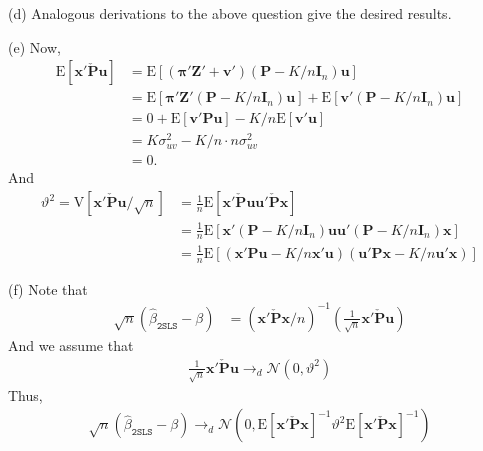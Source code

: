 \documentclass[11pt]{article}
\newcommand{\E}{\mathrm{E}}
\newcommand{\V}{\mathrm{V}}
\newcommand{\N}{\mathcal{N}}
\begin{document}
\iffalse
Now, to show the convergence result note that
\begin{align*}
\check{\bm{v}}'(\bm{P} -K/n\bm{I}_n) \bm{u} &= {\bm{v}}'\bm{P}\bm{u} -  \frac{\sigma^2_{uv}}{\sigma^2_u}\bm{u}'\bm{P}\bm{u} - \frac{K}{n}\bm{v}'\bm{u} + \frac{K}{n}\frac{\sigma^2_{uv}}{\sigma^2_u}\bm{u}'\bm{u}
\end{align*}
Thus
\begin{align*}
\frac{1}{\sqrt{K}} \check{\bm{v}}'(\bm{P} -K/n\bm{I}_n) \bm{u} =  {\bm{v}}'\bm{P}\bm{u} -  \frac{\sigma^2_{uv}}{\sigma^2_u}\bm{u}'\bm{P}\bm{u} - \frac{K}{n}\bm{v}'\bm{u} + \frac{K}{n}\frac{\sigma^2_{uv}}{\sigma^2_u}\bm{u}'\bm{u}
\end{align*}
\fi

(d)
Analogous derivations to the above question give the desired results.

(e)
Now,
\begin{align*}
\E[\bm{x}'\check{\bm{P}}\bm{u}] &= \E[(\bm{\pi}'\bm{Z}'+\bm{v}')(\bm{P} -K/n\bm{I}_n)\bm{u}]\\
&= \E[\bm{\pi}'\bm{Z}'(\bm{P} -K/n\bm{I}_n)\bm{u}] + \E[\bm{v}'(\bm{P} -K/n\bm{I}_n)\bm{u}]\\
&=0 + \E[\bm{v}'\bm{P}\bm{u}] - K/n\E[\bm{v}'\bm{u}]\\
&= K \sigma^2_{uv} - K/n \cdot n \sigma^2_{uv}\\
&=0.
\end{align*}
And
\begin{align*}
\vartheta^2 = \V[\bm{x}'\check{\bm{P}}\bm{u}/\sqrt{n}] &= \frac{1}{n}\E[\bm{x}'\check{\bm{P}}\bm{u}\bm{u}'\check{\bm{P}}\bm{x}]\\
&=\frac{1}{n}\E[\bm{x}'(\bm{P} -K/n\bm{I}_n)\bm{u}\bm{u}'(\bm{P} -K/n\bm{I}_n)\bm{x}]\\
&=\frac{1}{n}\E[(\bm{x}'\bm{P}\bm{u} - K/n\bm{x}'\bm{u})(\bm{u}'\bm{P}\bm{x}-K/n\bm{u}'\bm{x})]
\end{align*}

(f)
Note that
\begin{align*}
\sqrt{n}(\hat\beta_{\texttt{2SLS}} - \beta) &= (\bm{x}'\check{\bm{P}}\bm{x}/n)^{-1}(\frac{1}{\sqrt{n}}\bm{x}'\check{\bm{P}}\bm{u})
\end{align*}
And we assume that
\begin{align*}
\frac{1}{\sqrt{n}}\bm{x}'\check{\bm{P}}\bm{u} \to_d \N(0, \vartheta^2)
\end{align*}
Thus,
\begin{align*}
\sqrt{n}(\hat\beta_{\texttt{2SLS}} - \beta) \to_d \N(0, \E[\bm{x}'\check{\bm{P}}\bm{x}]^{-1}\vartheta^2\E[\bm{x}'\check{\bm{P}}\bm{x}]^{-1})
\end{align*}
\end{document}
